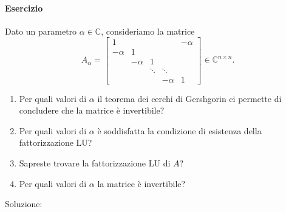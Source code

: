 \documentclass[a4paper]{report}
\theoremstyle{definition}
\theoremstyle{remark}
\begin{document}
\paragraph{Esercizio} Dato un parametro $\alpha \in \mathbb{C}$, consideriamo la matrice
\[
A_\alpha =
\begin{bmatrix}
    1  & & & & -\alpha\\
    -\alpha & 1 & & & \\
    & -\alpha & 1 & & \\
    & & \ddots & \ddots\\
    & & & -\alpha & 1
\end{bmatrix} \in \mathbb{C}^{n\times n}.
\]
\begin{enumerate}
    \item Per quali valori di $\alpha$ il teorema dei cerchi di Gershgorin ci permette di concludere che la matrice è invertibile?
    \item Per quali valori di $\alpha$ è soddisfatta la condizione di esistenza della fattorizzazione LU?
    \item Sapreste trovare la fattorizzazione LU di $A$?
    \item Per quali valori di $\alpha$ la matrice è invertibile?
\end{enumerate}
Soluzione:
\end{document}
